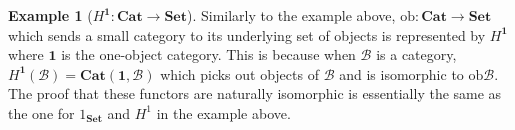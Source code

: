 \documentclass[11pt]{article}
\theoremstyle{definition}
\theoremstyle{definition}
\newtheorem{ex}{Example}
\theoremstyle{plain}
\theoremstyle{plain}
\theoremstyle{plain}
\begin{document}
\begin{ex}[$H^{\textbf{1}}:\textbf{Cat} \to \textbf{Set}$]
Similarly to the example above, $\text{ob}:\textbf{Cat} \to \textbf{Set}$ which sends a small category to its underlying set of objects is represented by $H^{\textbf{1}}$ where $\textbf{1}$ is the one-object category. This is because when $\mathscr{B}$ is a category, $H^{\textbf{1}}(\mathscr{B}) = \textbf{Cat}(\textbf{1}, \mathscr{B})$ which picks out objects of $\mathscr{B}$ and is isomorphic to $\text{ob}\mathscr{B}$. The proof that these functors are naturally isomorphic is essentially the same as the one for $1_{\textbf{Set}}$ and $H^{1}$ in the example above.
\end{ex}

\nocite{*}


\end{document}
